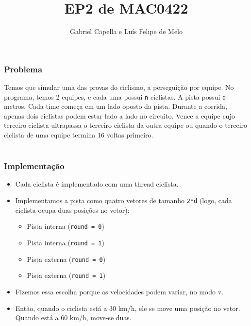 \documentclass{beamer}
\title[EP2]{EP2 de MAC0422} %
\author{Gabriel Capella e Luís Felipe de Melo} %
\institute[USP] %
{
Universidade de São Paulo \\ %
\medskip
}
\begin{document}
\begin{frame}
\titlepage %
\end{frame}




\begin{frame}
\frametitle{Problema}
Temos que simular uma das provas do ciclismo, a perseguição por equipe. No programa, temos 2 equipes, e cada uma possui \texttt{n} ciclistas. A pista possui \texttt{d} metros. Cada time começa em um lado oposto da pista. Durante a corrida, apenas dois ciclistas podem estar lado a lado no circuito. Vence a equipe cujo terceiro ciclista ultrapassa o terceiro ciclista da outra equipe ou quando o terceiro ciclista de uma equipe termina 16 voltas primeiro.\\~\\

\end{frame}

\begin{frame}
\frametitle{Implementação}	
\begin{itemize}
\item Cada ciclista é implementado com uma thread ciclista. 
\item Implementamos a pista como quatro vetores de tamanho \texttt{2*d} (logo, cada ciclista ocupa duas posições no vetor): 
	\begin{itemize}
		\item Pista interna (\texttt{round = 0})
		\item Pista interna (\texttt{round = 1})
		\item Pista externa (\texttt{round = 0})
		\item Pista externa (\texttt{round = 1})
	\end{itemize}
\item Fizemos essa escolha porque as velocidades podem variar, no modo v. 
\item Então, quando o ciclista está a 30 km/h, ele se move uma posição no vetor. Quando está a 60 km/h, move-se duas.
\end{itemize}
\end{frame}
\end{document}
